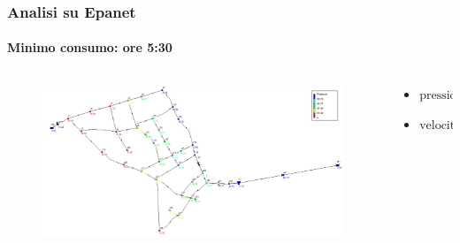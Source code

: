 \documentclass{beamer}
\begin{document}
%
\begin{frame}
	\frametitle{Analisi su Epanet}
	\framesubtitle{Minimo consumo: ore 5:30}
	\begin{columns}
		\begin{column}{.7\textwidth}
				\begin{figure}
					\centering
					\includegraphics[width=\linewidth]{images/pressure_min_demand}
				\end{figure}
		\end{column}
%
		\begin{column}{.3\textwidth}
			\begin{itemize}
				\item $\text{pressioni} \in [15, 70]\,m$
				\item $\text{velocit\`a} < 2\,\dfrac{m}{s}$
			\end{itemize}
		\end{column}
	\end{columns}
\end{frame}
%
%
%
\end{document}
